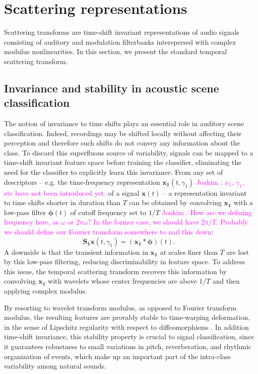 \documentclass[journal]{IEEEtran}
\makeatletter
\newcommand*{\eg}{e.g.\@\xspace}
\newcommand{\ja}[1]{\textcolor{magenta}{Joakim : #1}}
\makeatother
\begin{document}
\section{Scattering representations \label{sec:scattering}}

Scattering transforms are time-shift invariant representations of audio signals consisting of auditory and modulation filterbanks interspersed with complex modulus nonlinearities. In this section, we present the standard temporal scattering transform.

\subsection{Invariance and stability in acoustic scene classification}
The notion of invariance to time shifts plays an essential role in auditory scene classification.
Indeed, recordings may be shifted locally without affecting their perception and therefore such shifts do not convey any information about the class.
To discard this superfluous source of variability, signals can be mapped to a time-shift invariant feature space before training the classifier, eliminating the need for the classifier to explicitly learn this invariance.
From any set of descriptors -- \eg the time-frequency representation $\boldsymbol{x_1}(t,\gamma_1)$ \ja{$x_1$, $\gamma_1$, etc have not been introduced yet.} of a signal $\boldsymbol{x}(t)$ --
a representation invariant to time shifts shorter in duration than $T$ can be obtained
by convolving $\boldsymbol{x_1}$ with a low-pass filter $\boldsymbol{\phi}(t)$ of cutoff frequency
set to $1/T$ \ja{How are we defining frequency here, as $\omega$ or $2\pi\omega$? In the former case, we should have $2\pi/T$. Probably we should define our Fourier transform somewhere to nail this down}:
\begin{equation}
\mathbf{S_1}\boldsymbol{x}(t, \gamma_1) = (\boldsymbol{x_1} \ast \boldsymbol{\phi}) (t).
\end{equation}
A downside is that the transient information in $\boldsymbol{x_1}$ at scales finer than $T$ are lost by this low-pass filtering, reducing discriminability in feature space.
To address this issue, the temporal scattering transform recovers this information by convolving $\boldsymbol{x_1}$ with wavelets whose center frequencies are above $1/T$ and then applying complex modulus.

By resorting to wavelet transform modulus, as opposed to Fourier transform modulus, the resulting features are provably stable to time-warping deformation,
in the sense of Lipschitz regularity with respect to diffeomorphisms \cite{Mallat2012}.
In addition time-shift invariance, this stability property is crucial to signal classification, since it guarantees robustness to small variations in pitch, reverberation, and rhythmic organization of events, which make up an important part of the intra-class variability among natural sounds.
\end{document}
